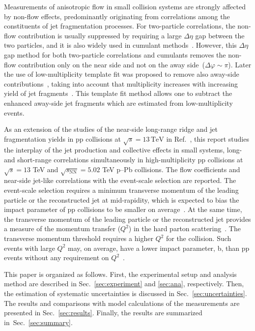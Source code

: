 Measurements of anisotropic flow in small collision systems are strongly affected by non-flow effects, predominantly originating from correlations among the constituents of jet fragmentation processes.
For two-particle correlations, the non-flow contribution is usually suppressed by requiring a large $\Delta\eta$ gap between the two particles,  and it is also widely used in cumulant methods~\cite{Bilandzic:2010jr, Acharya:2019vdf}. However, this $\Delta\eta$ gap method for both two-particle correlations and cumulants removes the non-flow contribution only on the near side and not on the away side~($\Delta\varphi\sim\pi$). Later the use of low-multiplicity template fit was proposed to remove also away-side contributions~\cite{ATLAS:2015hzw,ATLAS:2016yzd,ATLAS:2018ngv}, taking into account that multiplicity increases with increasing yield of jet fragments~\cite{CMS:2013ycn,ALICE:2013tla,ALICE:2014mas}. This template fit method allows one to subtract the enhanced away-side jet fragments which are estimated from low-multiplicity events. 

As an extension of the studies of the near-side long-range ridge and jet fragmentation yields in pp collisions at $\sqrt{s}=13\,\mathrm{TeV}$ in Ref.~\cite{ALICE:2021nir}, this report studies the interplay of the jet production and collective effects in small systems, long- and short-range correlations simultaneously in high-multiplicity pp collisions at $\sqrt{s} =13$ TeV and $\sqrt{s_{\mathrm{NN}}}=5.02$ TeV p--Pb collisions. The flow coefficients and near-side jet-like correlations with the event-scale selection are reported. The event-scale selection requires a minimum transverse momentum of the leading particle or the reconstructed jet at mid-rapidity, which is expected to bias the impact parameter of pp collisions to be smaller on average~\cite{Sjostrand:1986ep,Frankfurt:2003td,Frankfurt:2010ea}. At the same time, the transverse momentum of the leading particle or the reconstructed jet provides a measure of the momentum transfer ($Q^2$) in the hard parton scattering~\cite{Chatrchyan:2012tt, Chatrchyan:2011id}. The transverse momentum threshold requires a higher $Q^2$ for the collision. Such events with large $Q^2$ may, on average, have a lower impact parameter, b, than pp events without any requirement on $Q^2$~\cite{Frankfurt:2003td}.

This paper is organized as follows. First, the experimental setup and analysis method are described in Sec.~\ref{sec:experiment} and \ref{sec:ana}, respectively. Then, the estimation of systematic uncertainties is discussed in Sec.~\ref{sec:uncertainties}. The results and comparisons with model calculations of the measurements are presented in Sec.~\ref{sec:results}. Finally, the results are summarized in~Sec.~\ref{sec:summary}.

 
